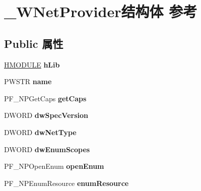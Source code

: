 \hypertarget{struct___w_net_provider}{}\section{\+\_\+\+W\+Net\+Provider结构体 参考}
\label{struct___w_net_provider}
\subsection*{Public 属性}
\begin{DoxyCompactItemize}
\item 
\mbox{\label{struct___w_net_provider_ac698c8b31032b2aeb9a11012becc5f3d}} 
\hyperlink{interfacevoid}{H\+M\+O\+D\+U\+LE} {\bfseries h\+Lib}
\item 
\mbox{\label{struct___w_net_provider_a4dc8951833bcc045da4a99fa00930dee}} 
P\+W\+S\+TR {\bfseries name}
\item 
\mbox{\label{struct___w_net_provider_af900411da13a4500210ae94ef818b100}} 
P\+F\+\_\+\+N\+P\+Get\+Caps {\bfseries get\+Caps}
\item 
\mbox{\label{struct___w_net_provider_ab4c881233ade5bb0d9b333e0f200dcb0}} 
D\+W\+O\+RD {\bfseries dw\+Spec\+Version}
\item 
\mbox{\label{struct___w_net_provider_a43e6a630ce426fa83acc265ba56f6ecc}} 
D\+W\+O\+RD {\bfseries dw\+Net\+Type}
\item 
\mbox{\label{struct___w_net_provider_a4580fed2c84f6057ba700d569b3aa7bb}} 
D\+W\+O\+RD {\bfseries dw\+Enum\+Scopes}
\item 
\mbox{\label{struct___w_net_provider_a151506bc83370a927e8cddd4c6fc1d80}} 
P\+F\+\_\+\+N\+P\+Open\+Enum {\bfseries open\+Enum}
\item 
\mbox{\label{struct___w_net_provider_a7dec647032f3a0638694504dbf47af2d}} 
P\+F\+\_\+\+N\+P\+Enum\+Resource {\bfseries enum\+Resource}
\item 
\mbox{\label{struct___w_net_provider_a51d8a94d6baf6874c0fac3c56e56963b}} 

\end{DoxyCompactItemize}
